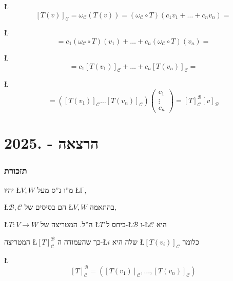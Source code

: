 \documentclass[english,hebrew]{article}
\begin{document}
\L{%
\[
[T(v)]_{\mathcal{C}}=\omega_{\mathcal{C}}(T(v))=(\omega_{\mathcal{C}}\circ T)(c_{1}v_{1}+\dots+c_{n}v_{n})=
\]
}%

\L{%
\[
=c_{1}(\omega_{\mathcal{C}}\circ T)(v_{1})+\dots+c_{n}(\omega_{\mathcal{C}}\circ T)(v_{n})=
\]
}%

\L{%
\[
=c_{1}[T(v_{1})]_{\mathcal{C}}+\dots+c_{n}[T(v_{n})]_{\mathcal{C}}=
\]
}%

\L{%
\[
=\left([T(v_{1})]_{\mathcal{C}}\dots[T(v_{n})]_{\mathcal{C}}\right)\begin{pmatrix}c_{1}\\
\vdots\\
c_{n}
\end{pmatrix}=[T]_{\mathcal{C}}^{\mathcal{B}}[v]_{\mathcal{B}}
\]
}%

\newpage{}

\noindent{}

\part{הרצאה {\endL} - {.2025\endL}}

\section{תזכורת}

יהיו \L{$V,W$} מ\textquotedblright ו נ\textquotedblright ס מעל \L{$\mathbb{F}$},

\L{$\mathcal{B},\mathcal{C}$} הם בסיסים של \L{$V,W$} בהתאמה,

\L{$T:V\rightarrow W$} ה\textquotedblright ל. המטריצה של \L{$T$}
ביחס ל-\L{$\mathcal{B}$} ו-\L{$\mathcal{C}$} היא

המטריצה \L{$[T]_{\mathcal{C}}^{\mathcal{B}}$} כך שהעמודה ה-\L{$i$}
שלה היא \L{$[T(v_{i})]_{\mathcal{C}}$} כלומר

\L{%
\[
[T]_{\mathcal{C}}^{\mathcal{B}}=\left([T(v_{1})]_{\mathcal{C}},\dots,[T(v_{n})]_{\mathcal{C}}\right)
\]
}%
\end{document}
